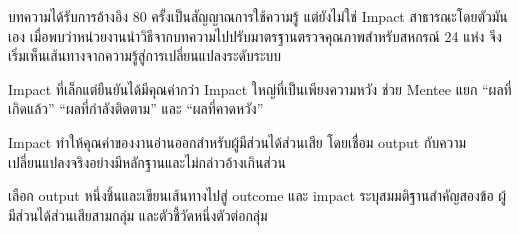 
\begin{examplebox}
บทความได้รับการอ้างอิง 80 ครั้งเป็นสัญญาณการใช้ความรู้ แต่ยังไม่ใช่ Impact สาธารณะโดยตัวมันเอง เมื่อพบว่าหน่วยงานนำวิธีจากบทความไปปรับมาตรฐานตรวจคุณภาพสำหรับสหกรณ์ 24 แห่ง จึงเริ่มเห็นเส้นทางจากความรู้สู่การเปลี่ยนแปลงระดับระบบ
\end{examplebox}


\begin{mentornote}
Impact ที่เล็กแต่ยืนยันได้มีคุณค่ากว่า Impact ใหญ่ที่เป็นเพียงความหวัง ช่วย Mentee แยก \enquote{ผลที่เกิดแล้ว} \enquote{ผลที่กำลังติดตาม} และ \enquote{ผลที่คาดหวัง}
\end{mentornote}

\begin{keytakeaway}
Impact ทำให้คุณค่าของงานอ่านออกสำหรับผู้มีส่วนได้ส่วนเสีย โดยเชื่อม output กับความเปลี่ยนแปลงจริงอย่างมีหลักฐานและไม่กล่าวอ้างเกินส่วน
\end{keytakeaway}

\begin{reflection}
เลือก output หนึ่งชิ้นและเขียนเส้นทางไปสู่ outcome และ impact ระบุสมมติฐานสำคัญสองข้อ ผู้มีส่วนได้ส่วนเสียสามกลุ่ม และตัวชี้วัดหนึ่งตัวต่อกลุ่ม
\blankline\blankline
\end{reflection}

